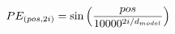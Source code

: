 \documentclass[preview]{standalone}
\begin{document}
\begin{align*}
\special{dvisvgm:raw <g id='unique000'>}PE_{(pos, 2i)} &= \sin\left(\frac{pos}{10000^{2i/d_{model}}}\right)\special{dvisvgm:raw </g>}
\end{align*}
\end{document}

